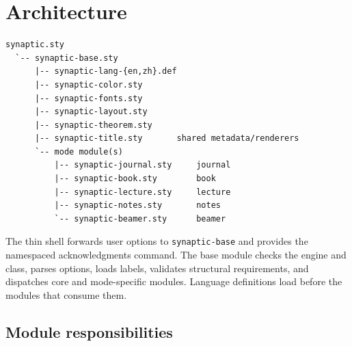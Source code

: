 \documentclass[a4paper,11pt]{scrartcl}
\begin{document}
\SynapticMakeTitle

\section{Architecture}

\begin{verbatim}
synaptic.sty
  `-- synaptic-base.sty
      |-- synaptic-lang-{en,zh}.def
      |-- synaptic-color.sty
      |-- synaptic-fonts.sty
      |-- synaptic-layout.sty
      |-- synaptic-theorem.sty
      |-- synaptic-title.sty       shared metadata/renderers
      `-- mode module(s)
          |-- synaptic-journal.sty     journal
          |-- synaptic-book.sty        book
          |-- synaptic-lecture.sty     lecture
          |-- synaptic-notes.sty       notes
          `-- synaptic-beamer.sty      beamer
\end{verbatim}

The thin shell forwards user options to \texttt{synaptic-base} and provides the
namespaced acknowledgments command. The base module checks the engine and
class, parses options, loads labels, validates structural requirements, and
dispatches core and mode-specific modules. Language definitions load before
the modules that consume them.

\subsection{Module responsibilities}
\end{document}
